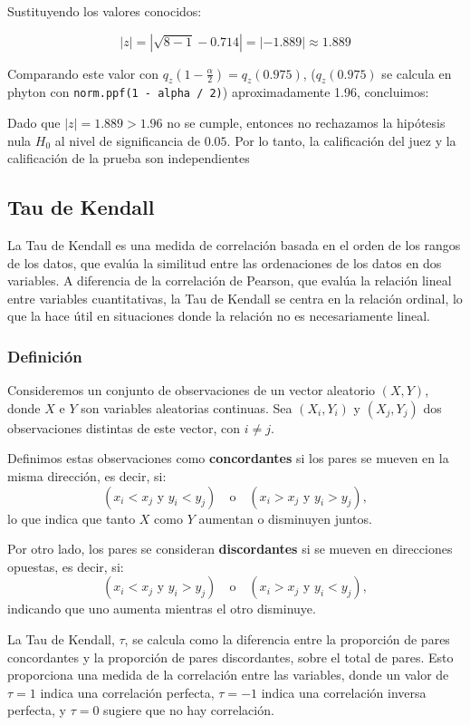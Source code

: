 \documentclass{article}
\begin{document}
Sustituyendo los valores conocidos:

\[
    |z| = |\sqrt{8-1}-0.714| = |-1.889| \approx 1.889
\]

Comparando este valor con \(q_z(1-\frac{\alpha}{2}) = q_z(0.975)\), ($q_z(0.975)$ se calcula en phyton con \texttt{norm.ppf(1 - alpha / 2)}) aproximadamente 1.96, concluimos:

Dado que \(|z| = 1.889 > 1.96\) no se cumple, entonces no rechazamos la hipótesis nula \(H_0\) al nivel de significancia de \(0.05\). Por lo tanto, la calificación del juez y la calificación de la prueba son independientes

\subsection{Tau de Kendall}

La Tau de Kendall es una medida de correlación basada en el orden de los rangos de los datos, que evalúa la similitud entre las ordenaciones de los datos en dos variables. A diferencia de la correlación de Pearson, que evalúa la relación lineal entre variables cuantitativas, la Tau de Kendall se centra en la relación ordinal, lo que la hace útil en situaciones donde la relación no es necesariamente lineal.

\subsubsection*{Definición}

Consideremos un conjunto de observaciones de un vector aleatorio \((X, Y)\), donde \(X\) e \(Y\) son variables aleatorias continuas. Sea \((X_i, Y_i)\) y \((X_j, Y_j)\) dos observaciones distintas de este vector, con \(i \neq j\).

Definimos estas observaciones como \textbf{concordantes} si los pares se mueven en la misma dirección, es decir, si:
\[
    (x_i < x_j \text{ y } y_i < y_j) \quad \text{o} \quad (x_i > x_j \text{ y } y_i > y_j),
\]
lo que indica que tanto \(X\) como \(Y\) aumentan o disminuyen juntos.

Por otro lado, los pares se consideran \textbf{discordantes} si se mueven en direcciones opuestas, es decir, si:
\[
    (x_i < x_j \text{ y } y_i > y_j) \quad \text{o} \quad (x_i > x_j \text{ y } y_i < y_j),
\]
indicando que uno aumenta mientras el otro disminuye.

La Tau de Kendall, \(\tau\), se calcula como la diferencia entre la proporción de pares concordantes y la proporción de pares discordantes, sobre el total de pares. Esto proporciona una medida de la correlación entre las variables, donde un valor de \(\tau = 1\) indica una correlación perfecta, \(\tau = -1\) indica una correlación inversa perfecta, y \(\tau = 0\) sugiere que no hay correlación.
\end{document}
